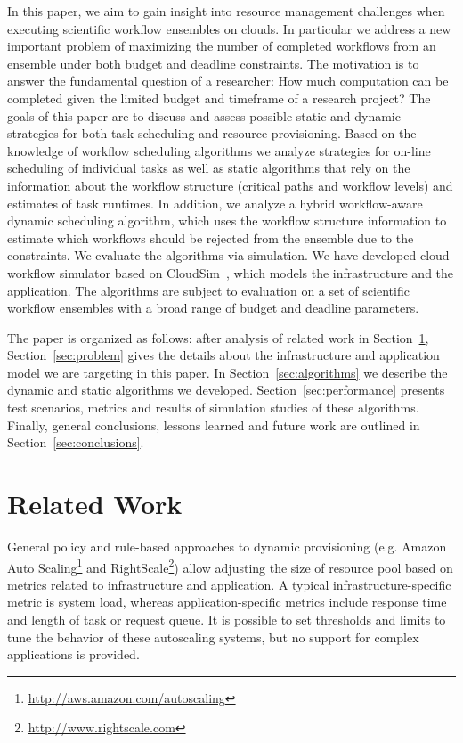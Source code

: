\documentclass{sig-alternate}
\begin{document}
In this paper, we aim to gain insight into resource management challenges when executing 
scientific workflow ensembles on clouds. In particular we address a new important problem of maximizing
the number of completed workflows from an ensemble under both budget and
deadline constraints. The motivation is to answer the fundamental question of a
researcher: How much computation can be completed given the limited budget and 
timeframe of a research project? The goals of this paper are to discuss and assess possible
static and dynamic strategies for both task scheduling and resource
provisioning. Based on the knowledge of workflow scheduling algorithms we
analyze strategies for on-line scheduling of individual tasks as well as static
algorithms that rely on the information about the workflow structure (critical
paths and workflow levels) and estimates of task runtimes. In addition, we
analyze a hybrid workflow-aware dynamic scheduling algorithm, which uses the
workflow structure information to estimate which workflows should be rejected
from the ensemble due to the constraints. We evaluate the algorithms via simulation. 
We have developed cloud workflow simulator based on
CloudSim~\cite{Calheiros11}, which models the infrastructure and the application. The
algorithms are subject to evaluation on a set of scientific workflow ensembles with a broad range of
budget and deadline parameters. 

The paper is organized as follows: after analysis of related work in
Section~\ref{sec:related}, Section~\ref{sec:problem} gives the details about the
infrastructure and application model we are targeting in this paper.
In Section~\ref{sec:algorithms} we describe the dynamic and
static algorithms we developed. Section~\ref{sec:performance} presents test
scenarios, metrics and results of simulation studies of these algorithms.
Finally, general conclusions, lessons learned and future work are outlined in
Section~\ref{sec:conclusions}.

\section{Related Work}
\label{sec:related}
General policy and rule-based approaches to dynamic provisioning (e.g. Amazon
Auto Scaling\footnote{\url{http://aws.amazon.com/autoscaling}} and
RightScale\footnote{\url{http://www.rightscale.com}}) allow adjusting the size
of resource pool based on metrics related to infrastructure and application.
A typical infrastructure-specific metric is system load, whereas
application-specific metrics include response time and length of task or
request queue. It is possible to set thresholds and limits to tune the behavior
of these autoscaling systems, but no support for complex applications is provided.
\end{document}
